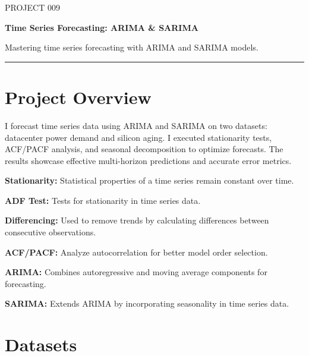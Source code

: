 \documentclass[11pt,a4paper]{article}
\begin{document}
\thispagestyle{empty}

{\colorbox{primary}{}}

\vspace{6pt}

{\fontsize{9}{11}\selectfont\color{codemuted}PROJECT 009}

\vspace{1pt}
{\fontsize{22}{27}\selectfont\bfseries\color{titleblue} Time Series Forecasting: ARIMA \& SARIMA}

\vspace{2pt}
{\normalsize\color{accent} Mastering time series forecasting with ARIMA and SARIMA models.}

\vspace{4pt}
{\color{tableheader}\rule{\linewidth}{0.4pt}}

\vspace{3pt}

\section{Project Overview}

I forecast time series data using ARIMA and SARIMA on two datasets: datacenter power demand and silicon aging. I executed stationarity tests, ACF/PACF analysis, and seasonal decomposition to optimize forecasts. The results showcase effective multi-horizon predictions and accurate error metrics.

\textbf{Stationarity:} Statistical properties of a time series remain constant over time.

\textbf{ADF Test:} Tests for stationarity in time series data.

\textbf{Differencing:} Used to remove trends by calculating differences between consecutive observations.

\textbf{ACF/PACF:} Analyze autocorrelation for better model order selection.

\textbf{ARIMA:} Combines autoregressive and moving average components for forecasting.

\textbf{SARIMA:} Extends ARIMA by incorporating seasonality in time series data.


\section{Datasets}
\end{document}
